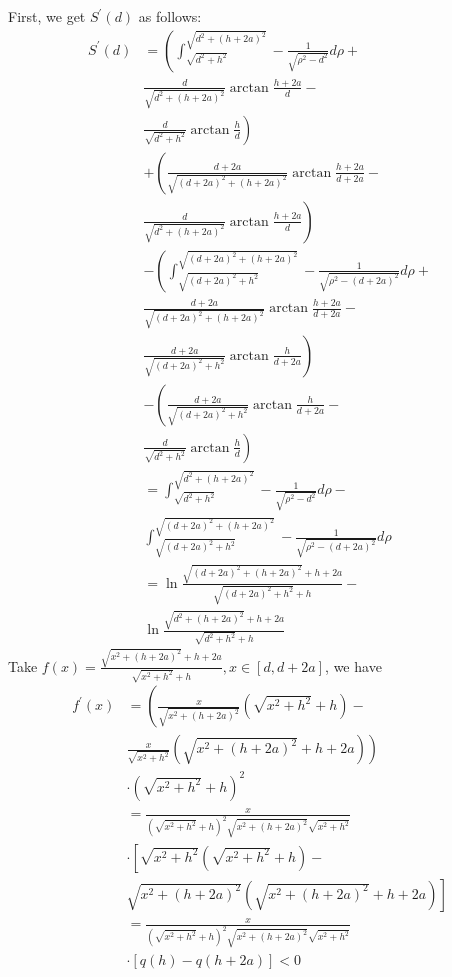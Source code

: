 \documentclass[letterpaper]{article} \usepackage{aaai23}  \usepackage{times}  \usepackage{helvet}  \usepackage{courier}  \usepackage[hyphens]{url}  \usepackage{graphicx} \urlstyle{rm} \def\UrlFont{\rm}  \usepackage{natbib}  \usepackage{caption} \frenchspacing  \setlength{\pdfpagewidth}{8.5in} \setlength{\pdfpageheight}{11in} \usepackage{algorithm}
\begin{document}
First, we get $S^{\prime}(d)$ as follows:
\begin{align*}\tag{6}
S^{\prime}(d)
&=\left(\int_{\sqrt{d^2+h^2}}^{\sqrt{d^2+(h+2a)^2}}-\frac{1}{\sqrt{\rho^2-d^2}}d\rho+\right.\\ &\left.
\frac{d}{\sqrt{d^2+(h+2a)^2}}\arctan\frac{h+2a}{d}-\right.\\ &\left.
\frac{d}{\sqrt{d^2+h^2}}\arctan\frac{h}{d}\right)\\
& +\left(\frac{d+2a}{\sqrt{(d+2a)^2+(h+2a)^2}}\arctan\frac{h+2a}{d+2a}-\right.\\ &\left.
\frac{d}{\sqrt{d^2+(h+2a)^2}}\arctan\frac{h+2a}{d}\right)\\
& -\left(\int_{\sqrt{(d+2a)^2+h^2}}^{\sqrt{(d+2a)^2+(h+2a)^2}}-\frac{1}{\sqrt{\rho^2-(d+2a)^2}}d\rho+\right.\\ &\left.
\frac{d+2a}{\sqrt{(d+2a)^2+(h+2a)^2}}\arctan\frac{h+2a}{d+2a}-\right.\\ &\left. 
\frac{d+2a}{\sqrt{(d+2a)^2+h^2}}\arctan\frac{h}{d+2a}\right)\\
&-\left(\frac{d+2a}{\sqrt{(d+2a)^2+h^2}}\arctan\frac{h}{d+2a}-\right.\\ &\left.
\frac{d}{\sqrt{d^2+h^2}}\arctan\frac{h}{d}\right)\\
&=\int_{\sqrt{d^2+h^2}}^{\sqrt{d^2+(h+2a)^2}} -\frac{1}{\sqrt{\rho^2-d^2}}d\rho-\\
&\int_{\sqrt{(d+2a)^2+h^2}}^{\sqrt{(d+2a)^2+(h+2a)^2}}-
\frac{1}{\sqrt{\rho^2-(d+2a)^2}}d\rho\\
& =\ln\frac{\sqrt{(d+2a)^2+(h+2a)^2}+h+2a}{\sqrt{(d+2a)^2+h^2}+h}-\\
&\ln\frac{\sqrt{d^2+(h+2a)^2}+h+2a}{\sqrt{d^2+h^2}+h}\end{align*}
Take $f(x)=\frac{\sqrt{x^2+(h+2a)^2}+h+2a}{\sqrt{x^2+h^2}+h}, x\in [d,d+2a]$, we have
\begin{align*}\tag{7}
f^{\prime}(x)&=\left(\frac{x}{\sqrt{x^2+(h+2a)^2}}(\sqrt{x^2+h^2}+h)-\right.\\ &\left.
\frac{x}{\sqrt{x^2+h^2}}(\sqrt{x^2+(h+2a)^2}+h+2a)\right)\\
&\cdot(\sqrt{x^2+h^2}+h)^2 \\
&=\frac{x}{(\sqrt{x^2+h^2}+h)^2\sqrt{x^2+(h+2a)^2}\sqrt{x^2+h^2}}\\
&\cdot\left[\sqrt{x^2+h^2}(\sqrt{x^2+h^2}+h)-\right.\\ &\left.\sqrt{x^2+(h+2a)^2}(\sqrt{x^2+(h+2a)^2}+h+2a)\right] \\
&=\frac{x}{(\sqrt{x^2+h^2}+h)^2\sqrt{x^2+(h+2a)^2}\sqrt{x^2+h^2}}\\
&\cdot\left[q(h)-q(h+2a)\right] < 0\end{align*}
\end{document}
